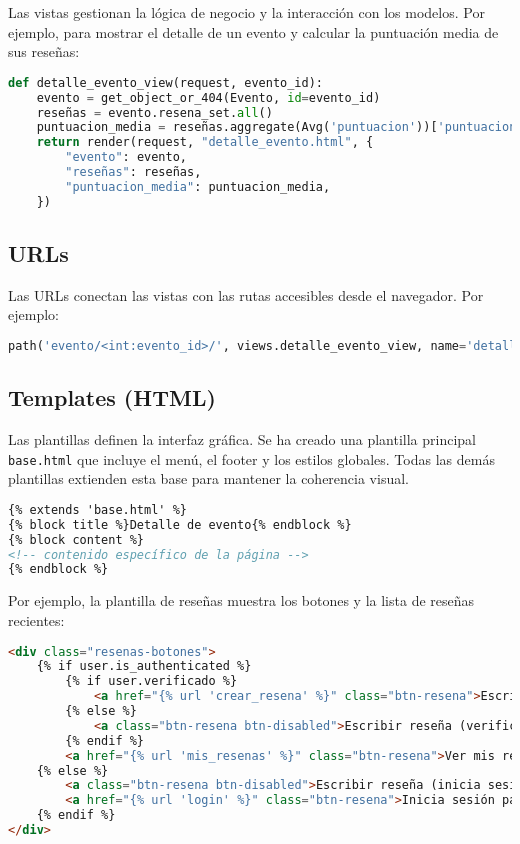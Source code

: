 Las vistas gestionan la lógica de negocio y la interacción con los modelos. Por ejemplo, para mostrar el detalle de un evento y calcular la puntuación media de sus reseñas:

\begin{lstlisting}[language=Python, caption={Vista de detalle de evento}]
def detalle_evento_view(request, evento_id):
    evento = get_object_or_404(Evento, id=evento_id)
    reseñas = evento.resena_set.all()
    puntuacion_media = reseñas.aggregate(Avg('puntuacion'))['puntuacion__avg']
    return render(request, "detalle_evento.html", {
        "evento": evento,
        "reseñas": reseñas,
        "puntuacion_media": puntuacion_media,
    })
\end{lstlisting}

\subsection{URLs}

Las URLs conectan las vistas con las rutas accesibles desde el navegador. Por ejemplo:

\begin{lstlisting}[language=Python, caption={Ruta para el detalle de evento}]
path('evento/<int:evento_id>/', views.detalle_evento_view, name='detalle_evento'),
\end{lstlisting}

\subsection{Templates (HTML)}

Las plantillas definen la interfaz gráfica. Se ha creado una plantilla principal \texttt{base.html} que incluye el menú, el footer y los estilos globales. Todas las demás plantillas extienden esta base para mantener la coherencia visual.

\begin{lstlisting}[language=HTML, caption={Extensión de base.html}]
{% extends 'base.html' %}
{% block title %}Detalle de evento{% endblock %}
{% block content %}
<!-- contenido específico de la página -->
{% endblock %}
\end{lstlisting}

Por ejemplo, la plantilla de reseñas muestra los botones y la lista de reseñas recientes:

\begin{lstlisting}[language=HTML, caption={Fragmento de plantilla de reseñas}]
<div class="resenas-botones">
    {% if user.is_authenticated %}
        {% if user.verificado %}
            <a href="{% url 'crear_resena' %}" class="btn-resena">Escribir reseña</a>
        {% else %}
            <a class="btn-resena btn-disabled">Escribir reseña (verifica tu cuenta)</a>
        {% endif %}
        <a href="{% url 'mis_resenas' %}" class="btn-resena">Ver mis reseñas</a>
    {% else %}
        <a class="btn-resena btn-disabled">Escribir reseña (inicia sesión)</a>
        <a href="{% url 'login' %}" class="btn-resena">Inicia sesión para ver tus reseñas</a>
    {% endif %}
</div>
\end{lstlisting}

